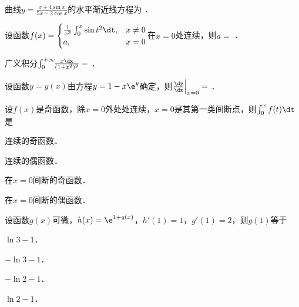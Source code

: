 \documentclass[plain,noanswer,medmath]{../../template/jnuexam}
\begin{document}






\begin{problem}
曲线$y = \frac{x + 4\sin x}{5x - 2\cos x}$的水平渐近线方程为 \fillin{}．
\end{problem}


\begin{problem}
设函数$f(x) = \begin{cases}
  \frac{1}{x^3}\int_0^x \sin t^2 \dt, & x \ne 0 \\
                                   a, & x = 0
\end{cases}$在$x = 0$处连续，则$a =$ \fillin{}．
\end{problem}


\begin{problem}
广义积分$\int_0^{+\infty}\!\!\frac{x\dx}{(1 + x^2)^2} =$ \fillin{}．
\end{problem}




\begin{problem}
设函数$y = y(x)$由方程$y = 1 - x\e^y$确定，则$\frac{\dy}{\dx}\Big|_{x=0}=$ \fillin{}．
\end{problem}








\begin{problem}
设$f(x)$是奇函数，除$x = 0$外处处连续，$x = 0$是其第一类间断点，则$\int_0^x f(t)\dt$是\pickout{}
\begin{abcd}
\item 连续的奇函数．
\item 连续的偶函数．
\item 在$x = 0$间断的奇函数．
\item 在$x = 0$间断的偶函数．
\end{abcd}
\end{problem}


\begin{problem}
设函数$g(x)$可微，$h(x) = \e^{1 + g(x)}$，$h'(1) = 1$，$g'(1) = 2$，则$g(1)$等于\pickout{}
\begin{abcd}
\item $\ln 3 - 1$．
\item $- \ln 3 - 1$．
\item $- \ln 2 - 1$．
\item $\ln 2 - 1$．
\end{abcd}
\end{problem}
\end{document}
